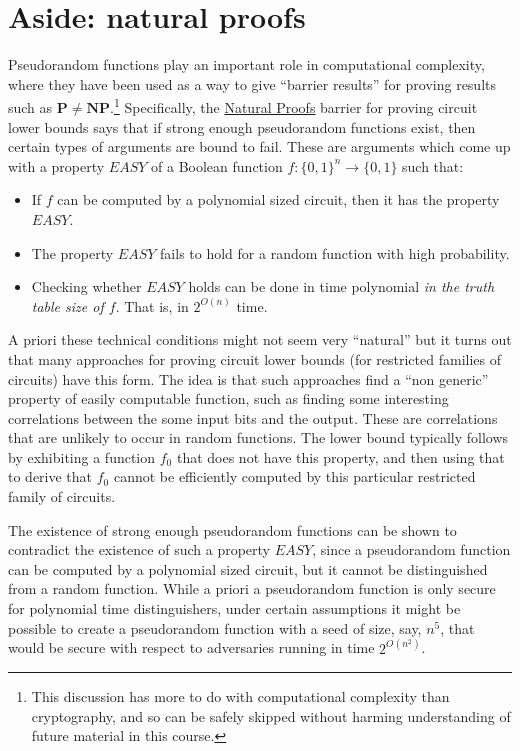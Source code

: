 \section{Aside: natural proofs}\label{4-Aside-natural-proofs}

Pseudorandom functions play an important role in computational
complexity, where they have been used as a way to give ``barrier
results'' for proving results such as
\(\mathbf{P}\neq \mathbf{NP}\).\footnote{This discussion has more to do
  with computational complexity than cryptography, and so can be safely
  skipped without harming understanding of future material in this
  course.} Specifically, the \href{https://goo.gl/fiH3Pe}{Natural
Proofs} barrier for proving circuit lower bounds says that if strong
enough pseudorandom functions exist, then certain types of arguments are
bound to fail. These are arguments which come up with a property
\(\ensuremath{\mathit{EASY}}\) of a Boolean function
\(f:\{0,1\}^n \rightarrow \{0,1\}\) such that:

\begin{itemize}
\item
  If \(f\) can be computed by a polynomial sized circuit, then it has
  the property \(\ensuremath{\mathit{EASY}}\).
\item
  The property \(\ensuremath{\mathit{EASY}}\) fails to hold for a random
  function with high probability.
\item
  Checking whether \(\ensuremath{\mathit{EASY}}\) holds can be done in
  time polynomial \emph{in the truth table size of \(f\)}. That is, in
  \(2^{O(n)}\) time.
\end{itemize}

A priori these technical conditions might not seem very ``natural'' but
it turns out that many approaches for proving circuit lower bounds (for
restricted families of circuits) have this form. The idea is that such
approaches find a ``non generic'' property of easily computable
function, such as finding some interesting correlations between the some
input bits and the output. These are correlations that are unlikely to
occur in random functions. The lower bound typically follows by
exhibiting a function \(f_0\) that does not have this property, and then
using that to derive that \(f_0\) cannot be efficiently computed by this
particular restricted family of circuits.

The existence of strong enough pseudorandom functions can be shown to
contradict the existence of such a property
\(\ensuremath{\mathit{EASY}}\), since a pseudorandom function can be
computed by a polynomial sized circuit, but it cannot be distinguished
from a random function. While a priori a pseudorandom function is only
secure for polynomial time distinguishers, under certain assumptions it
might be possible to create a pseudorandom function with a seed of size,
say, \(n^5\), that would be secure with respect to adversaries running
in time \(2^{O(n^2)}\).
